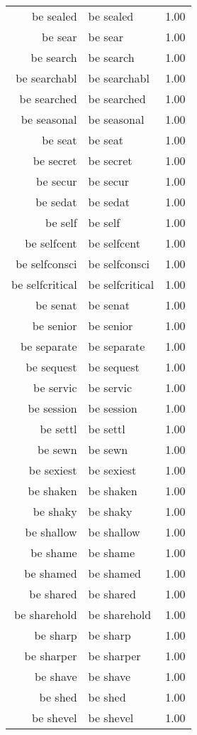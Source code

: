 \begin{table}[ht]
\begin{tabular}{rlr}
  be sealed & be sealed & 1.00 \\ 
  be sear & be sear & 1.00 \\ 
  be search & be search & 1.00 \\ 
  be searchabl & be searchabl & 1.00 \\ 
  be searched & be searched & 1.00 \\ 
  be seasonal & be seasonal & 1.00 \\ 
  be seat & be seat & 1.00 \\ 
  be secret & be secret & 1.00 \\ 
  be secur & be secur & 1.00 \\ 
  be sedat & be sedat & 1.00 \\ 
  be self & be self & 1.00 \\ 
  be selfcent & be selfcent & 1.00 \\ 
  be selfconsci & be selfconsci & 1.00 \\ 
  be selfcritical & be selfcritical & 1.00 \\ 
  be senat & be senat & 1.00 \\ 
  be senior & be senior & 1.00 \\ 
  be separate & be separate & 1.00 \\ 
  be sequest & be sequest & 1.00 \\ 
  be servic & be servic & 1.00 \\ 
  be session & be session & 1.00 \\ 
  be settl & be settl & 1.00 \\ 
  be sewn & be sewn & 1.00 \\ 
  be sexiest & be sexiest & 1.00 \\ 
  be shaken & be shaken & 1.00 \\ 
  be shaky & be shaky & 1.00 \\ 
  be shallow & be shallow & 1.00 \\ 
  be shame & be shame & 1.00 \\ 
  be shamed & be shamed & 1.00 \\ 
  be shared & be shared & 1.00 \\ 
  be sharehold & be sharehold & 1.00 \\ 
  be sharp & be sharp & 1.00 \\ 
  be sharper & be sharper & 1.00 \\ 
  be shave & be shave & 1.00 \\ 
  be shed & be shed & 1.00 \\ 
  be shevel & be shevel & 1.00 \\ 

\end{tabular}
\end{table}
